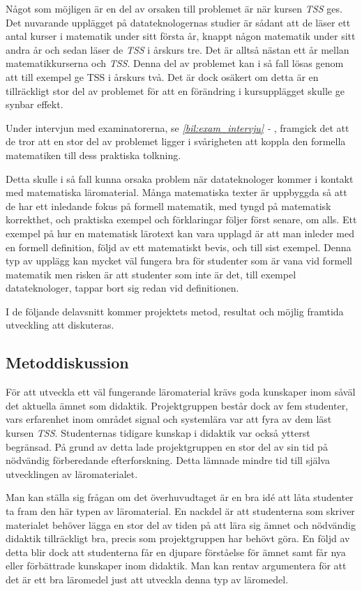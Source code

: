 \documentclass[12pt,a4paper,twoside,openright]{article}
\begin{document}
Något som möjligen är en del av orsaken till problemet är när kursen
\textit{TSS} ges. Det nuvarande upplägget på datateknologernas studier
är sådant att de läser ett antal kurser i matematik under sitt första
år, knappt någon matematik under sitt andra år och sedan läser de
\textit{TSS} i årskurs tre. Det är alltså nästan ett år mellan
matematikkurserna och \textit{TSS}. Denna del av problemet kan i så
fall lösas genom att till exempel ge TSS i årskurs två. Det är dock
osäkert om detta är en tillräckligt stor del av problemet för att en
förändring i kursupplägget skulle ge synbar effekt.

Under intervjun med examinatorerna, se \textit{\ref{bil:exam_intervju} - }, framgick det
att de tror att en stor del av problemet ligger i svårigheten att
koppla den formella matematiken till dess praktiska tolkning.

Detta skulle i så fall kunna orsaka problem när datateknologer kommer
i kontakt med matematiska läromaterial. Många matematiska texter är
uppbyggda så att de har ett inledande fokus på formell matematik, med
tyngd på matematisk korrekthet, och praktiska exempel och förklaringar
följer först senare, om alls. Ett exempel på hur en matematisk
lärotext kan vara upplagd är att man inleder med en formell definition,
följd av ett matematiskt bevis, och till sist exempel. Denna typ av
upplägg kan mycket väl fungera bra för studenter som är vana vid
formell matematik men risken är att studenter som inte är det, till
exempel datateknologer, tappar bort sig redan vid definitionen.

I de följande delavsnitt kommer projektets metod, resultat och möjlig
framtida utveckling att diskuteras.

\subsection{Metoddiskussion}
\label{sec:metDisk}
För att utveckla ett väl fungerande läromaterial krävs goda kunskaper
inom såväl det aktuella ämnet som didaktik. Projektgruppen består dock av fem studenter, vars erfarenhet
inom området signal och systemlära var att fyra av dem läst kursen
\textit{TSS}. Studenternas tidigare kunskap i didaktik var också
ytterst begränsad. På grund av detta lade projekt\-gruppen en stor del
av sin tid på nödvändig förberedande efterforskning. Detta lämnade
mindre tid till själva utvecklingen av läromaterialet.

Man kan ställa sig frågan om det överhuvudtaget är en bra idé att
låta studenter ta fram den här typen av läromaterial. En nackdel
är att studenterna som skriver materialet behöver lägga en stor
del av tiden på att lära sig ämnet och nödvändig didaktik
tillräckligt bra, precis som projektgruppen har behövt göra.
En följd av detta blir dock att studenterna
får en djupare förståelse för ämnet samt får nya
eller förbättrade kunskaper inom didaktik.
Man kan rentav argumentera för att det är ett bra läromedel just att
utveckla denna typ av läromedel.
\end{document}
